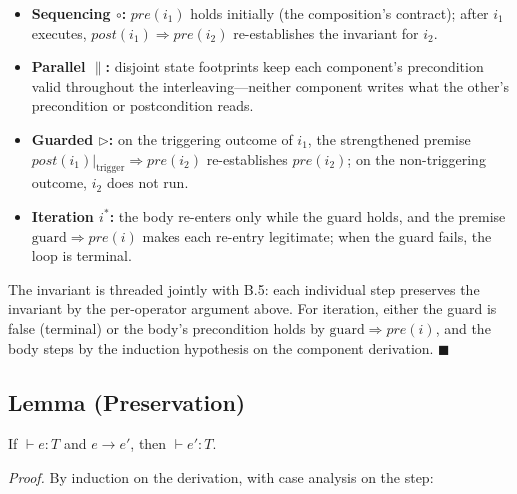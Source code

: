 \documentclass[
  11pt,
]{article}
\providecommand{\tightlist}{%
  \setlength{\itemsep}{0pt}\setlength{\parskip}{0pt}}
\begin{document}
\begin{itemize}
\tightlist
\item
  \textbf{Sequencing \(\circ\):} \(pre(i_1)\) holds initially (the
  composition's contract); after \(i_1\) executes,
  \(post(i_1) \Rightarrow pre(i_2)\) re-establishes the invariant for
  \(i_2\).
\item
  \textbf{Parallel \(\parallel\):} disjoint state footprints keep each
  component's precondition valid throughout the interleaving---neither
  component writes what the other's precondition or postcondition reads.
\item
  \textbf{Guarded \(\triangleright\):} on the triggering outcome of
  \(i_1\), the strengthened premise
  \(post(i_1)\big|_{\text{trigger}} \Rightarrow pre(i_2)\)
  re-establishes \(pre(i_2)\); on the non-triggering outcome, \(i_2\)
  does not run.
\item
  \textbf{Iteration \(i^*\):} the body re-enters only while the guard
  holds, and the premise \(\text{guard} \Rightarrow pre(i)\) makes each
  re-entry legitimate; when the guard fails, the loop is terminal.
\end{itemize}

The invariant is threaded jointly with B.5: each individual step
preserves the invariant by the per-operator argument above. For
iteration, either the guard is false (terminal) or the body's
precondition holds by \(\text{guard} \Rightarrow pre(i)\), and the body
steps by the induction hypothesis on the component derivation.
\(\blacksquare\)

\subsection{Lemma (Preservation)}\label{lemma-preservation}

If \(\vdash e : T\) and \(e \rightarrow e'\), then \(\vdash e' : T\).

\emph{Proof.} By induction on the derivation, with case analysis on the
step:
\end{document}
